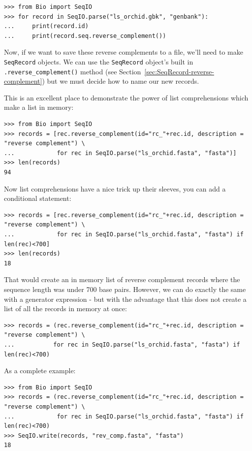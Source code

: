 \documentclass{report}
\begin{document}
\begin{verbatim}
>>> from Bio import SeqIO
>>> for record in SeqIO.parse("ls_orchid.gbk", "genbank"):
...     print(record.id)
...     print(record.seq.reverse_complement())
\end{verbatim}

Now, if we want to save these reverse complements to a file, we'll need to make \verb|SeqRecord| objects.
We can use  the \verb|SeqRecord| object's built in \verb|.reverse_complement()| method (see Section~\ref{sec:SeqRecord-reverse-complement}) but we must decide how to name our new records.

This is an excellent place to demonstrate the power of list comprehensions which make a list in memory:
\begin{verbatim}
>>> from Bio import SeqIO
>>> records = [rec.reverse_complement(id="rc_"+rec.id, description = "reverse complement") \
...            for rec in SeqIO.parse("ls_orchid.fasta", "fasta")]
>>> len(records)
94
\end{verbatim}

\noindent Now list comprehensions have a nice trick up their sleeves, you can add a conditional statement:

\begin{verbatim}
>>> records = [rec.reverse_complement(id="rc_"+rec.id, description = "reverse complement") \
...            for rec in SeqIO.parse("ls_orchid.fasta", "fasta") if len(rec)<700]
>>> len(records)
18
\end{verbatim}

That would create an in memory list of reverse complement records where the sequence length was under 700 base pairs. However, we can do exactly the same with a generator expression - but with the advantage that this does not create a list of all the records in memory at once:

\begin{verbatim}
>>> records = (rec.reverse_complement(id="rc_"+rec.id, description = "reverse complement") \
...           for rec in SeqIO.parse("ls_orchid.fasta", "fasta") if len(rec)<700)
\end{verbatim}

As a complete example:

\begin{verbatim}
>>> from Bio import SeqIO
>>> records = (rec.reverse_complement(id="rc_"+rec.id, description = "reverse complement") \
...            for rec in SeqIO.parse("ls_orchid.fasta", "fasta") if len(rec)<700)
>>> SeqIO.write(records, "rev_comp.fasta", "fasta")
18
\end{verbatim}
\end{document}
